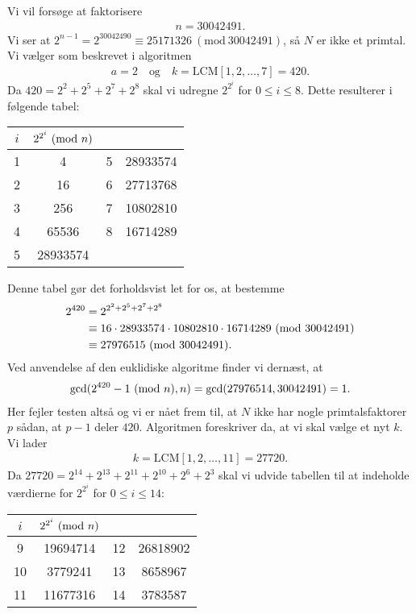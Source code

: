 \begin{example}
Vi vil forsøge at faktorisere 
\begin{align*}
	n = 30042491.
\end{align*}
Vi ser at $2^{n-1} = 2^{30042490} \equiv 25171326 \ (\textrm{mod}\ 30042491)$,
så $N$ er ikke et primtal. Vi vælger som beskrevet i algoritmen
\begin{align*}
	a = 2 \quad \text{og} \quad k = \mathrm{LCM}[1,2, \ldots, 7] = 420.
\end{align*}
Da $420 = 2^2 + 2^5 + 2^7 + 2^8$ skal vi udregne $2^{2^i}$ for 
$0 \leq i \leq 8$. Dette resulterer i følgende tabel:

\begin{center}
\begin{tabular}{c c c c}
$i$ & $2^{2^i} \ (\mathrm{mod} \ n)$ & & \\ 
\hline 
1 & 4 & 5 & 28933574 \\ 
2 & 16 & 6 & 27713768 \\ 
3 & 256 & 7 & 10802810 \\ 
4 & 65536 & 8 & 16714289 \\ 
5 & 28933574 & & 
\end{tabular} 
\end{center}
Denne tabel gør det forholdsvist let for os, at bestemme
\begin{align*}
	2^{420} &= 2^{2^2 + 2^5 + 2^7 + 2^8} \\
	&\equiv 16 \cdot 28933574 \cdot 10802810 \cdot 16714289
	\ (\mathrm{mod} \ 30042491) \\
	&\equiv 27976515 \ (\mathrm{mod} \ 30042491).
\end{align*}
Ved anvendelse af den euklidiske algoritme finder vi dernæst, at
\begin{align*}
	\mathrm{gcd}(2^{420} - 1 \ (\mathrm{mod} \ n), n) = \mathrm{gcd}(27976514, 30042491) = 1.
\end{align*}
Her fejler testen altså og vi er nået frem til, at $N$ ikke har nogle 
primtalsfaktorer $p$ sådan, at $p-1$ deler $420$. Algoritmen foreskriver da, at vi skal vælge et nyt $k$. Vi lader
\begin{align*}
	k = \mathrm{LCM}[1,2, \ldots, 11] = 27720.
\end{align*}
Da $27720 = 2^{14} + 2^{13} + 2^{11} + 2^{10} + 2^{6} + 2^3$ skal vi udvide tabellen til at indeholde værdierne for $2^{2^i}$ for $0 \leq i \leq 14$:

\begin{center}
\begin{tabular}{c c c c}
$i$ & $2^{2^i} \ (\mathrm{mod} \ n)$ & &  \\ 
\hline 
9 & 19694714 & 12 & 26818902 \\ 
10 & 3779241 & 13 & 8658967 \\ 
11 & 11677316 & 14 & 3783587 \\ 
\end{tabular} 
\end{center}


\end{example}
